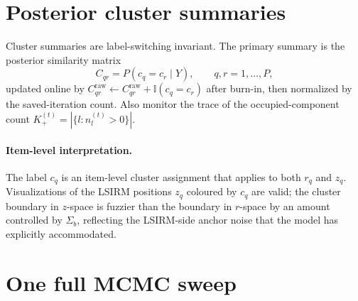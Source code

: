 \documentclass[11pt]{article}
\newcommand{\ind}{\mathbb I}
\begin{document}
\section{Posterior cluster summaries}

Cluster summaries are label-switching invariant.  The primary summary is the
posterior similarity matrix
\begin{equation}
    C_{qr}=P(c_q=c_r\mid Y),
    \qquad q,r=1,\dots,P,
\end{equation}
updated online by $C_{qr}^{\mathrm{raw}}\leftarrow C_{qr}^{\mathrm{raw}}+\ind(c_q=c_r)$
after burn-in, then normalized by the saved-iteration count.  Also monitor
the trace of the occupied-component count $K_+^{(t)}=|\{l:n_l^{(t)}>0\}|$.

\paragraph{Item-level interpretation.}
The label $c_q$ is an item-level cluster assignment that applies to both
$r_q$ and $z_q$.  Visualizations of the LSIRM positions $z_q$ coloured by
$c_q$ are valid; the cluster boundary in $z$-space is fuzzier than the
boundary in $r$-space by an amount controlled by $\Sigma_b$, reflecting the
LSIRM-side anchor noise that the model has explicitly accommodated.

\section{One full MCMC sweep}
\end{document}
